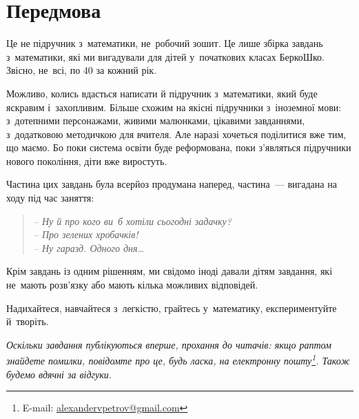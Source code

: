 \chapter*{Передмова}

Це не підручник з~математики, не~робочий зошит.
Це лише збірка завдань з~математики, які ми вигадували для дітей
у~початкових класах БеркоШко.
Звісно, не~всі, по 40 за кожний рік.

Можливо, колись вдасться написати й підручник з~математики,
який буде яскравим і~захопливим.
Більше схожим на якісні підручники з~іноземної мови: з~дотепними персонажами,
живими малюнками, цікавими завданнями, з~додатковою методичкою для вчителя.
Але наразі хочеться поділитися вже тим, що маємо.
Бо поки система освіти буде реформована, поки з’являться підручники
нового покоління, діти вже виростуть.

Частина цих завдань була всерйоз продумана наперед,
частина~--- вигадана на ходу під час заняття:
\begin{quote}
\itshape
-- Ну й про кого ви~б хотіли сьогодні задачку? \\
-- Про зелених хробачків! \\
-- Ну гаразд. Одного дня\ldots
\end{quote}

Крім завдань із одним рішенням, ми свідомо іноді давали дітям завдання,
які не~мають розв’язку або мають кілька можливих відповідей.

Надихайтеся, навчайтеся з~легкістю, грайтесь у~математику,
експериментуйте й~творіть. \smiley

\medskip
\medskip

\emph{\small
Оскільки завдання публікуються вперше, прохання до читачів:
якщо раптом знайдете помилки,
повідомте про це, будь ласка, на електронну пошту\footnote{
    E-mail: \href{mailto:alexandervpetrov@gmail.com}{alexandervpetrov@gmail.com}
}. Також будемо вдячні за відгуки.
}%
\smiley
